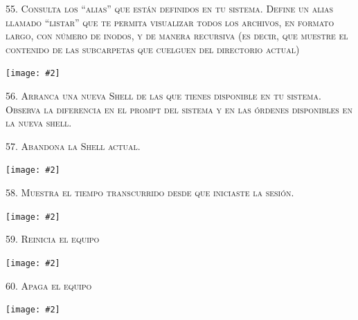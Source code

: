 \documentclass[a4paper,12pt]{article}
\newcommand{\mygraphic}[2][height=0.45\textheight]{\begin{center}
		\centering\texttt{[image: \#2]}\par
\end{center}}
\begin{document}
\newpage
\textsc{55. Consulta los “alias” que están definidos en tu sistema. Define un alias llamado “listar” que te permita visualizar todos los archivos, en formato largo, con número de inodos, y de manera recursiva (es decir, que muestre el contenido de las subcarpetas que cuelguen del directorio actual)}
\mygraphic{imatges/55.png}

\newpage
\textsc{56. Arranca una nueva Shell de las que tienes disponible en tu sistema. Observa la diferencia en el prompt del sistema y en las órdenes disponibles en la nueva shell.}

\textsc{57. Abandona la Shell actual.}
\mygraphic{imatges/56-57.png}

\newpage
\textsc{58. Muestra el tiempo transcurrido desde que iniciaste la sesión. }
\mygraphic{imatges/58.png}

\newpage
\textsc{59. Reinicia el equipo }
\mygraphic{imatges/59.png}

\newpage
\textsc{60. Apaga el equipo}
\mygraphic{imatges/60.png}
\end{document}
